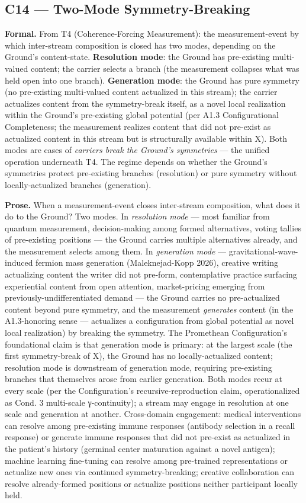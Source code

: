 \documentclass[11pt, openany]{book}
\begin{document}
\subsection{C14 --- Two-Mode Symmetry-Breaking}

\textbf{Formal.} From T4 (Coherence-Forcing Measurement): the measurement-event by which inter-stream composition is closed has two modes, depending on the Ground's content-state. \textbf{Resolution mode}: the Ground has pre-existing multi-valued content; the carrier selects a branch (the measurement collapses what was held open into one branch). \textbf{Generation mode}: the Ground has pure symmetry (no pre-existing multi-valued content actualized in this stream); the carrier actualizes content from the symmetry-break itself, as a novel local realization within the Ground's pre-existing global potential (per A1.3 Configurational Completeness; the measurement realizes content that did not pre-exist as actualized content in this stream but is structurally available within X). Both modes are cases of \textit{carriers break the Ground's symmetries} --- the unified operation underneath T4. The regime depends on whether the Ground's symmetries protect pre-existing branches (resolution) or pure symmetry without locally-actualized branches (generation).

\textbf{Prose.} When a measurement-event closes inter-stream composition, what does it do to the Ground? Two modes. In \textit{resolution mode} --- most familiar from quantum measurement, decision-making among formed alternatives, voting tallies of pre-existing positions --- the Ground carries multiple alternatives already, and the measurement selects among them. In \textit{generation mode} --- gravitational-wave-induced fermion mass generation (Maleknejad-Kopp 2026), creative writing actualizing content the writer did not pre-form, contemplative practice surfacing experiential content from open attention, market-pricing emerging from previously-undifferentiated demand --- the Ground carries no pre-actualized content beyond pure symmetry, and the measurement \textit{generates} content (in the A1.3-honoring sense --- actualizes a configuration from global potential as novel local realization) by breaking the symmetry. The Promethean Configuration's foundational claim is that generation mode is primary: at the largest scale (the first symmetry-break of X), the Ground has no locally-actualized content; resolution mode is downstream of generation mode, requiring pre-existing branches that themselves arose from earlier generation. Both modes recur at every scale (per the Configuration's recursive-reproduction claim, operationalized as Cond. 3 multi-scale γ-continuity); a stream may engage in resolution at one scale and generation at another. Cross-domain engagement: medical interventions can resolve among pre-existing immune responses (antibody selection in a recall response) or generate immune responses that did not pre-exist as actualized in the patient's history (germinal center maturation against a novel antigen); machine learning fine-tuning can resolve among pre-trained representations or actualize new ones via continued symmetry-breaking; creative collaboration can resolve already-formed positions or actualize positions neither participant locally held.
\end{document}

